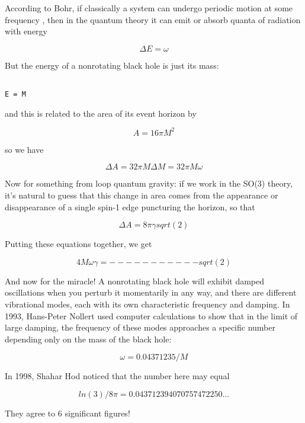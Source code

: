 According to Bohr, if classically a system can undergo periodic motion
at some frequency \omega , then in the quantum theory it can emit or
absorb quanta of radiation with energy 


$$

\Delta  E = \omega  
$$
    
But the energy of a nonrotating black hole is just its mass:


\begin{verbatim}

E = M
\end{verbatim}
    
and this is related to the area of its event horizon by


$$

A = 16 \pi  M^{2}
$$
    
so we have


$$

\Delta  A = 32 \pi  M \Delta  M

        = 32 \pi  M \omega 
$$
    
Now for something from loop quantum gravity: if we work in the
SO(3) theory, it's natural to guess that this change in area
comes from the appearance or disappearance of a single spin-1
edge puncturing the horizon, so that


$$

\Delta  A = 8 \pi  \gamma  sqrt(2)
$$
    
Putting these equations together, we get


$$

         4 M \omega          
\gamma  = -----------
          sqrt(2)
$$
    
And now for the miracle!  A nonrotating black hole will exhibit damped
oscillations when you perturb it momentarily in any way, and there are
different vibrational modes, each with its own characteristic frequency
and damping.  In 1993, Hans-Peter Nollert used computer calculations to show
that in the limit of large damping, the frequency of these modes
approaches a specific number depending only on the mass of the black
hole:


$$

\omega  = 0.04371235 / M
$$
    
In 1998, Shahar Hod noticed that the number here may equal


$$

ln(3) / 8 \pi  = 0.043712394070757472250... 
$$
    
They agree to 6 significant figures!  

